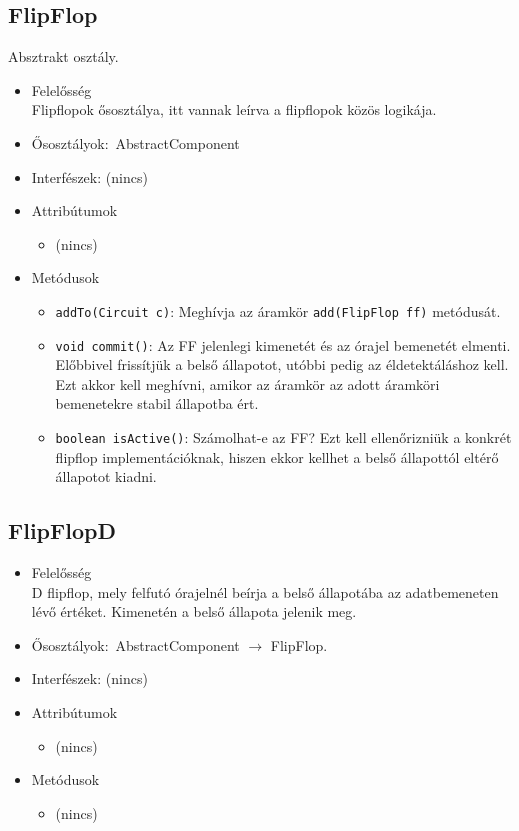 \subsection{FlipFlop}
Absztrakt osztály.
\begin{itemize}
\item Felelősség\\
Flipflopok ősosztálya, itt vannak leírva a flipflopok közös logikája.
\item Ősosztályok:\ AbstractComponent
\item Interfészek: (nincs)
\item Attribútumok $\ $
\begin{itemize}
\item (nincs)
\end{itemize}
\item Metódusok$\ $
\begin{itemize}
	\item \texttt{addTo(Circuit c)}: Meghívja az áramkör \texttt{add(FlipFlop ff)} metódusát.
	\item \texttt{void commit()}: Az FF jelenlegi kimenetét és az órajel bemenetét elmenti. Előbbivel frissítjük a belső állapotot, utóbbi pedig az éldetektáláshoz kell. Ezt akkor kell meghívni, amikor az áramkör az adott áramköri bemenetekre stabil állapotba ért.
	\item \texttt{boolean isActive()}: Számolhat-e az FF? Ezt kell ellenőrizniük a konkrét flipflop implementációknak, hiszen ekkor kellhet a belső állapottól eltérő állapotot kiadni.
\end{itemize}
\end{itemize}

\subsection{FlipFlopD}
\begin{itemize}
\item Felelősség\\
D flipflop, mely felfutó órajelnél beírja a belső állapotába az adatbemeneten lévő értéket. Kimenetén a belső állapota jelenik meg.
\item Ősosztályok:\ AbstractComponent $\rightarrow{}$ FlipFlop.
\item Interfészek: (nincs)
\item Attribútumok $\ $
\begin{itemize}
\item (nincs)
\end{itemize}
\item Metódusok$\ $
\begin{itemize}
\item (nincs)
\end{itemize}
\end{itemize}

